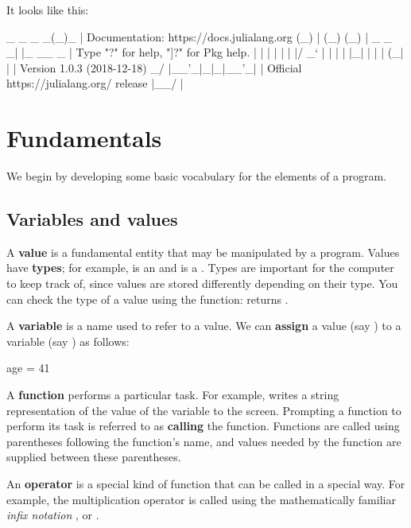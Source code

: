 \documentclass[prettycode,jlmin,shellescape]{watsonbook}
\begin{document}
  \begin{solution}
    It looks like this: 
    \begin{textblock}[title=]
                   _
       _       _ _(_)_     |  Documentation: https://docs.julialang.org
      (_)     | (_) (_)    |
       _ _   _| |_  __ _   |  Type "?" for help, "]?" for Pkg help.
      | | | | | | |/ _` |  |
      | | |_| | | | (_| |  |  Version 1.0.3 (2018-12-18)
     _/ |\__'_|_|_|\__'_|  |  Official https://julialang.org/ release
    |__/                   |
    \end{textblock}
\end{solution}
  
  \section{Fundamentals}

  We begin by developing some basic vocabulary for the elements of a
  program.
  
\subsection{Variables and values}

A \textbf{value} is a fundamental entity that may be manipulated by a
program. Values have \textbf{types}; for example,  is
an  and  is a
. Types are important for the computer to keep track
of, since values are stored differently depending on their type. You
can check the type of a value using the  function:
 returns . 

A \textbf{variable} is a name used to refer to a value. We can
\textbf{assign} a value (say ) to a variable (say
) as follows:
\begin{juliablock}[title=]
  age = 41 
\end{juliablock}

A \textbf{function} performs a particular task. For example,
 writes a string representation of the value
of the variable  to the screen.  Prompting a
function to perform its task is referred to as \textbf{calling}
the function. Functions are called using parentheses following the
function's name, and values needed by the function are supplied
between these parentheses.

An \textbf{operator} is a special kind of function that can be
called in a special way. For example, the multiplication operator
\jlverb{*} is called using the mathematically familiar
\textit{infix notation} , or
.
\end{document}
